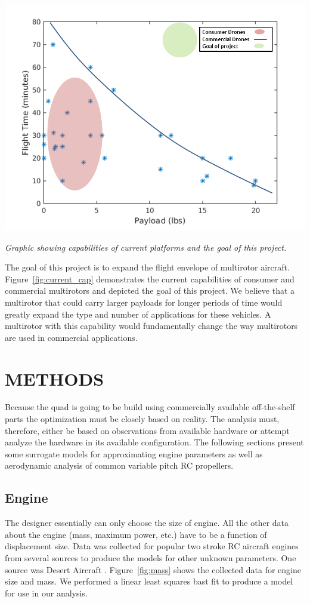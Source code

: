 \documentclass[letterpaper, 10 pt, conference]{ieeeconf}  %
\makeatletter
\newenvironment{figurehere}
  {\def\@captype{figure}}
  {}
\makeatother
\begin{document}
\begin{figurehere}
	\begin{center}
		\includegraphics[width=.5\textwidth]{current_capabilities.png}
		\caption{\textit{Graphic showing capabilities of current platforms and the goal of this project.}} %
		\label{fig:current_cap}
	\end{center}
\end{figurehere}

The goal of this project is to expand the flight envelope of multirotor aircraft.  Figure~\ref{fig:current_cap} demonstrates the current capabilities of consumer and commercial multirotors and depicted the goal of this project.  We believe that a multirotor that could carry larger payloads for longer periods of time would greatly expand the type and number of applications for these vehicles. A multirotor with this capability would fundamentally change the way multirotors are used in commercial applications. 

\section{METHODS}

Because the quad is going to be build using commercially available off-the-shelf parts the optimization must be closely based on reality.  The analysis must, therefore, either be based on observations from available hardware or attempt analyze the hardware in its available configuration.  The following sections present some surrogate models for approximating engine parameters as well as aerodynamic analysis of common variable pitch RC propellers. 

\subsection{Engine} 

The designer essentially can only choose the size of engine. All the other data about the engine (mass, maximum power, etc.) have to be a function of displacement size.  Data was collected for popular two stroke RC aircraft engines from several sources to produce the models for other unknown parameters. One source was Desert Aircraft \cite{da2016}.  Figure~\ref{fig:mass} shows the collected data for engine size and mass.  We performed a linear least squares bast fit to produce a model for use in our analysis.
\end{document}
